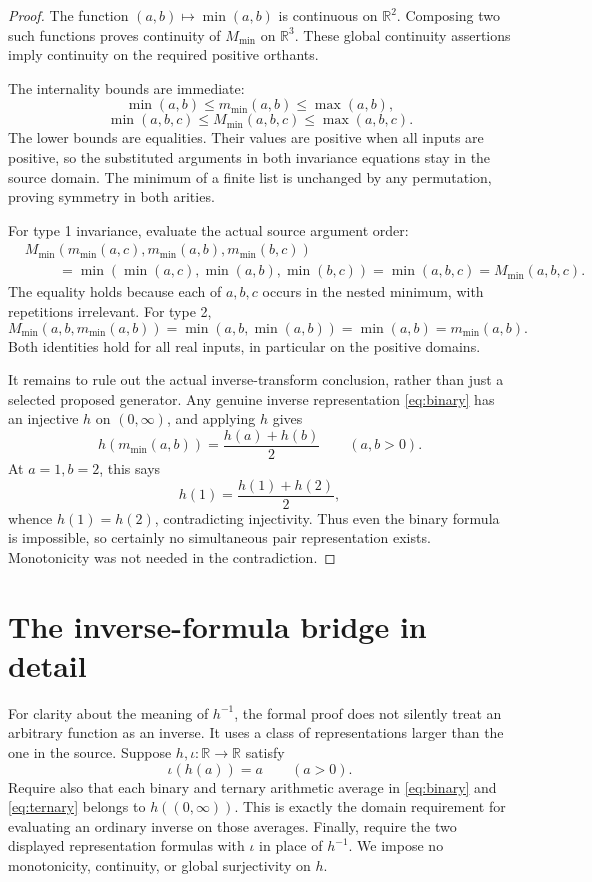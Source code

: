 \documentclass[11pt]{article}
\newcommand{\R}{\mathbb R}
\begin{document}
\begin{proof}
The function $(a,b)\mapsto\min(a,b)$ is continuous on $\R^2$. Composing two such functions proves continuity of $M_{\min}$ on $\R^3$. These global continuity assertions imply continuity on the required positive orthants.

The internality bounds are immediate:
\[
 \min(a,b)\le m_{\min}(a,b)\le\max(a,b),
\]
\[
 \min(a,b,c)\le M_{\min}(a,b,c)\le\max(a,b,c).
\]
The lower bounds are equalities. Their values are positive when all inputs are positive, so the substituted arguments in both invariance equations stay in the source domain. The minimum of a finite list is unchanged by any permutation, proving symmetry in both arities.

For type 1 invariance, evaluate the actual source argument order:
\begin{align*}
&M_{\min}(m_{\min}(a,c),m_{\min}(a,b),m_{\min}(b,c))\\
&\hspace{1cm}=\min(\min(a,c),\min(a,b),\min(b,c))
 =\min(a,b,c)=M_{\min}(a,b,c).
\end{align*}
The equality holds because each of $a,b,c$ occurs in the nested minimum, with repetitions irrelevant. For type 2,
\[
 M_{\min}(a,b,m_{\min}(a,b))=\min(a,b,\min(a,b))=\min(a,b)=m_{\min}(a,b).
\]
Both identities hold for all real inputs, in particular on the positive domains.

It remains to rule out the actual inverse-transform conclusion, rather than just a selected proposed generator. Any genuine inverse representation \eqref{eq:binary} has an injective $h$ on $(0,\infty)$, and applying $h$ gives
\begin{equation}\label{eq:generator}
 h(m_{\min}(a,b))=\frac{h(a)+h(b)}2\qquad(a,b>0).
\end{equation}
At $a=1,b=2$, this says
\[
 h(1)=\frac{h(1)+h(2)}2,
\]
whence $h(1)=h(2)$, contradicting injectivity. Thus even the binary formula is impossible, so certainly no simultaneous pair representation exists. Monotonicity was not needed in the contradiction.
\end{proof}

\section{The inverse-formula bridge in detail}
For clarity about the meaning of $h^{-1}$, the formal proof does not silently treat an arbitrary function as an inverse. It uses a class of representations larger than the one in the source. Suppose $h,\iota\colon\R\to\R$ satisfy
\begin{equation}\label{eq:leftinverse}
 \iota(h(a))=a\qquad(a>0).
\end{equation}
Require also that each binary and ternary arithmetic average in \eqref{eq:binary} and \eqref{eq:ternary} belongs to $h((0,\infty))$. This is exactly the domain requirement for evaluating an ordinary inverse on those averages. Finally, require the two displayed representation formulas with $\iota$ in place of $h^{-1}$. We impose no monotonicity, continuity, or global surjectivity on $h$.
\end{document}
